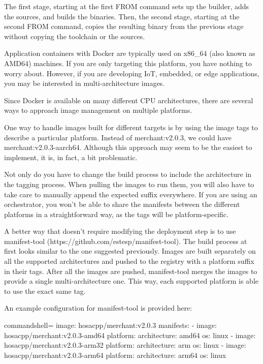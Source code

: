 The first stage, starting at the first FROM command sets up the builder, adds the sources, and builds the binaries. Then, the second stage, starting at the second FROM command, copies the resulting binary from the previous stage without copying the toolchain or the sources.


Application containers with Docker are typically used on x86\_64 (also known as AMD64) machines. If you are only targeting this platform, you have nothing to worry about. However, if you are developing IoT, embedded, or edge applications, you may be interested in multi-architecture images. 

Since Docker is available on many different CPU architectures, there are several ways to approach image management on multiple platforms.

One way to handle images built for different targets is by using the image tags to describe a particular platform. Instead of merchant:v2.0.3, we could have merchant:v2.0.3-aarch64. Although this approach may seem to be the easiest to implement, it is, in fact, a bit problematic.

Not only do you have to change the build process to include the architecture in the tagging process. When pulling the images to run them, you will also have to take care to manually append the expected suffix everywhere. If you are using an orchestrator, you won't be able to share the manifests between the different platforms in a straightforward way, as the tags will be platform-specific.

A better way that doesn't require modifying the deployment step is to use manifest-tool (https://github.com/estesp/manifest-tool). The build process at first looks similar to the one suggested previously. Images are built separately on all the supported architectures and pushed to the registry with a platform suffix in their tags. After all the images are pushed, manifest-tool merges the images to provide a single multi-architecture one. This way, each supported platform is able to use the exact same tag.

An example configuration for manifest-tool is provided here:

\begin{tcblisting}{commandshell={}}
image: hosacpp/merchant:v2.0.3
manifests:
  - image: hosacpp/merchant:v2.0.3-amd64
    platform:
      architecture: amd64
      os: linux
  - image: hosacpp/merchant:v2.0.3-arm32
    platform:
      architecture: arm
      os: linux
  - image: hosacpp/merchant:v2.0.3-arm64
    platform:
      architecture: arm64
      os: linux
\end{tcblisting}

